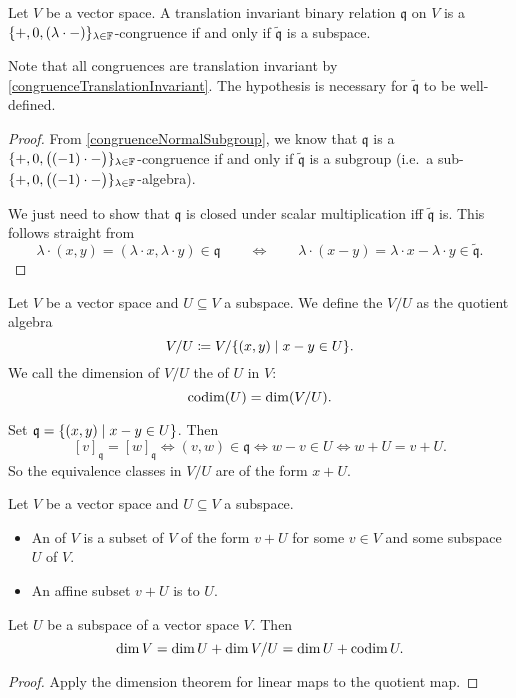\begin{proposition} \label{congruenceSubspace}
Let $V$ be a vector space.
A translation invariant binary relation $\mathfrak{q}$ on $V$ is a $\{+,0, (\lambda\cdot -)\}_{\lambda\in\mathbb{F}}$-congruence \textup{if and only if} $\widetilde{\mathfrak{q}}$ is a subspace.
\end{proposition}
Note that all congruences are translation invariant by \ref{congruenceTranslationInvariant}. The hypothesis is necessary for $\widetilde{\mathfrak{q}}$ to be well-defined.
\begin{proof}
From \ref{congruenceNormalSubgroup}, we know that $\mathfrak{q}$ is a $\{+,0, \big((-1)\cdot -\big)\}_{\lambda\in\mathbb{F}}$-congruence if and only if $\widetilde{\mathfrak{q}}$ is a subgroup (i.e.\ a sub-$\{+,0, \big((-1)\cdot -\big)\}_{\lambda\in\mathbb{F}}$-algebra).

We just need to show that $\mathfrak{q}$ is closed under scalar multiplication iff $\widetilde{\mathfrak{q}}$ is. This follows straight from
\[ \lambda\cdot(x,y) = (\lambda\cdot x, \lambda\cdot y)\in \mathfrak{q} \qquad\iff\qquad \lambda\cdot(x-y) = \lambda\cdot x - \lambda\cdot y\in \widetilde{\mathfrak{q}}. \]
\end{proof}


\begin{definition}
Let $V$ be a vector space and $U\subseteq V$ a subspace.
We define the  $V/U$ as the quotient algebra
\[ V/U \defeq V/\setbuilder{(x,y)}{x-y\in U}. \]
We call the dimension of $V/U$ the  of $U$ in $V$:
\[ \operatorname{codim}(U) = \dim(V/U). \]
\end{definition}


Set $\mathfrak{q} = \setbuilder{(x,y)}{x-y\in U}$. Then
\[ [v]_\mathfrak{q}=[w]_\mathfrak{q} \iff (v,w)\in\mathfrak{q} \iff w-v\in U \iff w+U = v+U. \]
So the equivalence classes in $V/U$ are of the form $x+U$.

\begin{definition}
Let $V$ be a vector space and $U\subseteq V$ a subspace.
\begin{itemize}
\item An  of $V$ is a subset of $V$ of the form $v+U$ for some $v\in V$ and some subspace $U$ of $V$.
\item An affine subset $v+U$ is  to $U$.
\end{itemize}
\end{definition}

\begin{proposition}
Let $U$ be a subspace of a vector space $V$. Then
\[ \dim V = \dim U + \dim V/U = \dim U + \operatorname{codim} U.  \]
\end{proposition}
\begin{proof}
Apply the dimension theorem for linear maps to the quotient map.
\end{proof}

